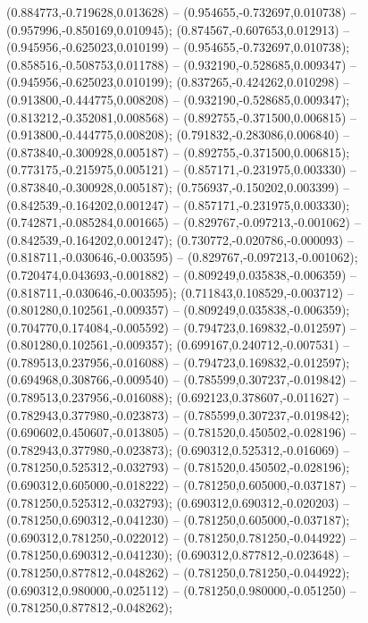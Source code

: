  (0.884773,-0.719628,0.013628) -- (0.954655,-0.732697,0.010738) -- (0.957996,-0.850169,0.010945);
 (0.874567,-0.607653,0.012913) -- (0.945956,-0.625023,0.010199) -- (0.954655,-0.732697,0.010738);
 (0.858516,-0.508753,0.011788) -- (0.932190,-0.528685,0.009347) -- (0.945956,-0.625023,0.010199);
 (0.837265,-0.424262,0.010298) -- (0.913800,-0.444775,0.008208) -- (0.932190,-0.528685,0.009347);
 (0.813212,-0.352081,0.008568) -- (0.892755,-0.371500,0.006815) -- (0.913800,-0.444775,0.008208);
 (0.791832,-0.283086,0.006840) -- (0.873840,-0.300928,0.005187) -- (0.892755,-0.371500,0.006815);
 (0.773175,-0.215975,0.005121) -- (0.857171,-0.231975,0.003330) -- (0.873840,-0.300928,0.005187);
 (0.756937,-0.150202,0.003399) -- (0.842539,-0.164202,0.001247) -- (0.857171,-0.231975,0.003330);
 (0.742871,-0.085284,0.001665) -- (0.829767,-0.097213,-0.001062) -- (0.842539,-0.164202,0.001247);
 (0.730772,-0.020786,-0.000093) -- (0.818711,-0.030646,-0.003595) -- (0.829767,-0.097213,-0.001062);
 (0.720474,0.043693,-0.001882) -- (0.809249,0.035838,-0.006359) -- (0.818711,-0.030646,-0.003595);
 (0.711843,0.108529,-0.003712) -- (0.801280,0.102561,-0.009357) -- (0.809249,0.035838,-0.006359);
 (0.704770,0.174084,-0.005592) -- (0.794723,0.169832,-0.012597) -- (0.801280,0.102561,-0.009357);
 (0.699167,0.240712,-0.007531) -- (0.789513,0.237956,-0.016088) -- (0.794723,0.169832,-0.012597);
 (0.694968,0.308766,-0.009540) -- (0.785599,0.307237,-0.019842) -- (0.789513,0.237956,-0.016088);
 (0.692123,0.378607,-0.011627) -- (0.782943,0.377980,-0.023873) -- (0.785599,0.307237,-0.019842);
 (0.690602,0.450607,-0.013805) -- (0.781520,0.450502,-0.028196) -- (0.782943,0.377980,-0.023873);
 (0.690312,0.525312,-0.016069) -- (0.781250,0.525312,-0.032793) -- (0.781520,0.450502,-0.028196);
 (0.690312,0.605000,-0.018222) -- (0.781250,0.605000,-0.037187) -- (0.781250,0.525312,-0.032793);
 (0.690312,0.690312,-0.020203) -- (0.781250,0.690312,-0.041230) -- (0.781250,0.605000,-0.037187);
 (0.690312,0.781250,-0.022012) -- (0.781250,0.781250,-0.044922) -- (0.781250,0.690312,-0.041230);
 (0.690312,0.877812,-0.023648) -- (0.781250,0.877812,-0.048262) -- (0.781250,0.781250,-0.044922);
 (0.690312,0.980000,-0.025112) -- (0.781250,0.980000,-0.051250) -- (0.781250,0.877812,-0.048262);
